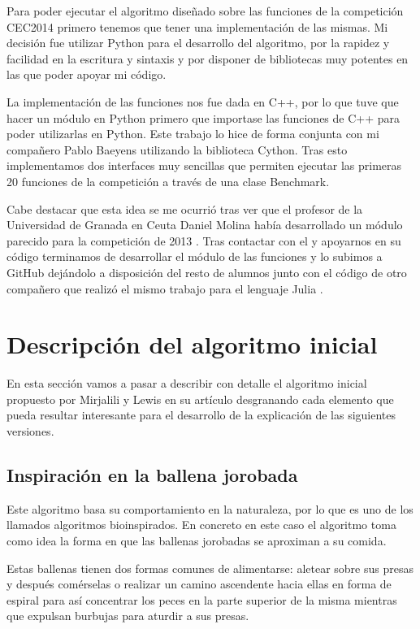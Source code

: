 \documentclass[12pt,a4paper]{article}
\begin{document}
		Para poder ejecutar el algoritmo diseñado sobre las funciones de la competición CEC2014 primero tenemos que tener una implementación de las mismas. Mi decisión fue utilizar Python para el desarrollo del algoritmo, por la rapidez y facilidad en la escritura y sintaxis y por disponer de bibliotecas muy potentes en las que poder apoyar mi código.
	
		La implementación de las funciones nos fue dada en C++, por lo que tuve que hacer un módulo en Python primero que importase las funciones de C++ para poder utilizarlas en Python. Este trabajo lo hice de forma conjunta con mi compañero Pablo Baeyens utilizando la biblioteca Cython. Tras esto implementamos dos interfaces muy sencillas que permiten ejecutar las primeras 20 funciones de la competición a través de una clase Benchmark.
		
		Cabe destacar que esta idea se me ocurrió tras ver que el profesor de la Universidad de Granada en Ceuta Daniel Molina había desarrollado un módulo parecido para la competición de 2013 \cite{danielMolinaCEC2013}. Tras contactar con el y apoyarnos en su código terminamos de desarrollar el módulo de las funciones y lo subimos a GitHub dejándolo a disposición del resto de alumnos junto con el código de otro compañero que realizó el mismo trabajo para el lenguaje Julia \cite{cec2014github}.

	\newpage

	\section{Descripción del algoritmo inicial}
	\label{sec:descripcionAlgoritmoInicial}
	
		En esta sección vamos a pasar a describir con detalle el algoritmo inicial propuesto por Mirjalili y Lewis en su artículo \cite{paperWOA} desgranando cada elemento que pueda resultar interesante para el desarrollo de la explicación de las siguientes versiones.
	
	\subsection{Inspiración en la ballena jorobada}
	
		Este algoritmo basa su comportamiento en la naturaleza, por lo que es uno de los llamados algoritmos bioinspirados. En concreto en este caso el algoritmo toma como idea la forma en que las ballenas jorobadas se aproximan a su comida.
		
		Estas ballenas tienen dos formas comunes de alimentarse: aletear sobre sus presas y después comérselas o realizar un camino ascendente hacia ellas en forma de espiral para así concentrar los peces en la parte superior de la misma mientras que expulsan burbujas para aturdir a sus presas.
		
\end{document}
